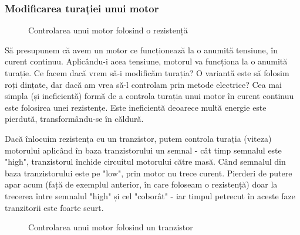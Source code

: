 \subsubsection{Modificarea turației unui motor}

\begin{figure}
  \vspace{-20pt}
  \vspace{-15pt}
  \caption{\label{fig:CodeWarrior-ResistenceMethod} Controlarea unui motor folosind o rezistență}
  \vspace{-20pt}
\end{figure}

Să presupunem că avem un motor ce funcționează la o anumită tensiune, în curent continuu. Aplicându-i acea tensiune, motorul va funcționa la o anumită turație. Ce facem dacă vrem să-i modificăm turația? O variantă este să folosim roți dințate, dar dacă am vrea să-l controlam prin metode electrice? Cea mai simpla (și ineficientă) formă de a controla turația unui motor în curent continuu este folosirea unei rezistențe. Este ineficientă deoarece multă energie este pierdută, transformându-se în căldură.

Dacă înlocuim rezistența cu un tranzistor, putem controla turația (viteza) motorului aplicând în baza tranzistorului un semnal - cât timp semnalul este "high", tranzistorul închide circuitul motorului către masă. Când semnalul din baza tranzistorului este pe "low", prin motor nu trece curent. Pierderi de putere apar acum (față de exemplul anterior, în care foloseam o rezistență) doar la trecerea între semnalul "high" și cel "coborât" - iar timpul petrecut în aceste faze tranzitorii este foarte scurt.

\begin{figure}
  \vspace{-20pt}
  \vspace{-15pt}
  \caption{\label{fig:CodeWarrior-TransistorMethod} Controlarea unui motor folosind un tranzistor}
  \vspace{-20pt}
\end{figure}

